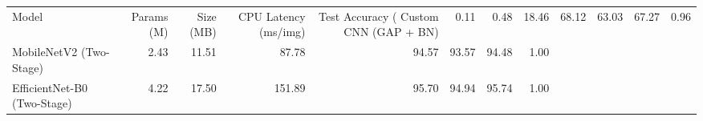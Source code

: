 \begin{tabular}{lrrrrrrr}
\toprule
Model & Params (M) & Size (MB) & CPU Latency (ms/img) & Test Accuracy (%
\midrule
Custom CNN (GAP + BN) & 0.11 & 0.48 & 18.46 & 68.12 & 63.03 & 67.27 & 0.96 \\
MobileNetV2 (Two-Stage) & 2.43 & 11.51 & 87.78 & 94.57 & 93.57 & 94.48 & 1.00 \\
EfficientNet-B0 (Two-Stage) & 4.22 & 17.50 & 151.89 & 95.70 & 94.94 & 95.74 & 1.00 \\
\bottomrule
\end{tabular}
